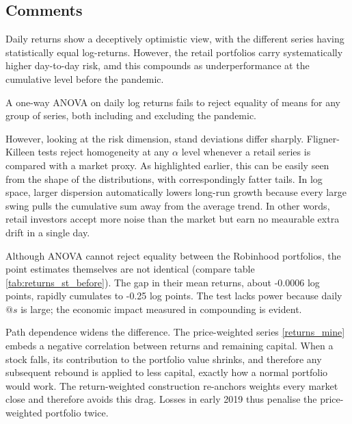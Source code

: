 \subsection{Comments}
Daily returns show a deceptively optimistic view, with the different series having statistically equal log-returns.
However, the retail portfolios carry systematically higher day-to-day risk, amd this compounds as underperformance at the cumulative level before the pandemic.

A one-way ANOVA on daily log returns fails to reject equality of means for any group of series, both including and excluding the pandemic. 

However, looking at the risk dimension, stand deviations differ sharply. 
Fligner-Killeen tests reject homogeneity at any $\alpha$ level whenever a retail series is compared with a market proxy.
As highlighted earlier, this can be easily seen from the shape of the distributions, with correspondingly fatter tails.
In log space, larger dispersion automatically lowers long-run growth because every large swing pulls the cumulative sum away from the average trend.
In other words, retail investors accept more noise than the market but earn no meaurable extra drift in a single day.

Although ANOVA cannot reject equality between the Robinhood portfolios, the point estimates themselves are not identical (compare table \ref{tab:returns_st_before}).
The gap in their mean returns, about -0.0006 log points, rapidly cumulates to -0.25 log points. 
The test lacks power because daily $@s$ is large; the economic impact measured in compounding is evident.

Path dependence widens the difference.
The price-weighted series \ref{returns_mine} embeds a negative correlation between returns and remaining capital.
When a stock falls, its contribution to the portfolio value shrinks, and therefore any subsequent rebound is applied to less capital, exactly how a normal portfolio would work. 
The return-weighted construction re-anchors weights every market close and therefore avoids this drag.
Losses in early 2019 thus penalise the price-weighted portfolio twice.  





